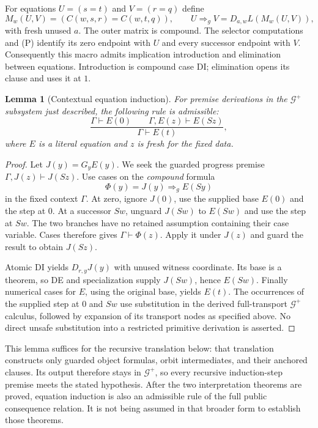 \documentclass[11pt,letterpaper]{article}
\newtheorem{lemma}[theorem]{Lemma}
\theoremstyle{definition}\newtheorem{definition}[theorem]{Definition}
\theoremstyle{remark}\newtheorem{remark}[theorem]{Remark}
\begin{document}
For equations $U=(s=t)$ and $V=(r=q)$ define
\[
 M_w(U,V)=(C(w,s,r)=C(w,t,q)),\qquad
 U\Rightarrow_g V=D_{a,w}L(M_w(U,V)),
\]
with fresh unused $a$. The outer matrix is compound. The selector
computations and (P) identify its zero endpoint with $U$ and every
successor endpoint with $V$. Consequently this macro admits implication
introduction and elimination between equations. Introduction is compound
case DI; elimination opens its clause and uses it at $1$.

\begin{lemma}[Contextual equation induction]\label{lem:eqind}
For premise derivations in the $\mathcal G^+$ subsystem just described,
the following rule is admissible:
\[
 \frac{\Gamma\vdash E(0)\qquad\Gamma,E(z)\vdash E(Sz)}
      {\Gamma\vdash E(t)},
\]
where $E$ is a literal equation and $z$ is fresh for the fixed data.
\end{lemma}
\begin{proof}
Let $J(y)=G_yE(y)$. We seek the guarded progress premise
$\Gamma,J(z)\vdash J(Sz)$. Use cases on the \emph{compound} formula
\[
       \Phi(y)=J(y)\Rightarrow_g E(Sy)
\]
in the fixed context $\Gamma$. At zero, ignore $J(0)$, use the supplied
base $E(0)$ and the step at $0$. At a successor $Sw$, unguard $J(Sw)$ to
$E(Sw)$ and use the step at $Sw$. The two branches have no retained
assumption containing their case variable. Cases therefore gives
$\Gamma\vdash\Phi(z)$. Apply it under $J(z)$ and guard the result to
obtain $J(Sz)$.

Atomic DI yields $D_{r,y}J(y)$ with unused witness coordinate. Its base is
a theorem, so DE and specialization supply $J(Sw)$, hence $E(Sw)$.
Finally numerical cases for $E$, using the original base, yields $E(t)$.
The occurrences of the supplied step at $0$ and $Sw$ use substitution in
the derived full-transport $\mathcal G^+$ calculus, followed by expansion
of its transport nodes as specified above. No direct unsafe substitution
into a restricted primitive derivation is asserted.
\end{proof}

This lemma suffices for the recursive translation below: that translation
constructs only guarded object formulas, orbit intermediates, and their
anchored clauses. Its output therefore stays in $\mathcal G^+$, so every
recursive induction-step premise meets the stated hypothesis. After the
two interpretation theorems are proved, equation induction is also an
admissible rule of the full public consequence relation. It is not being
assumed in that broader form to establish those theorems.
\end{document}
